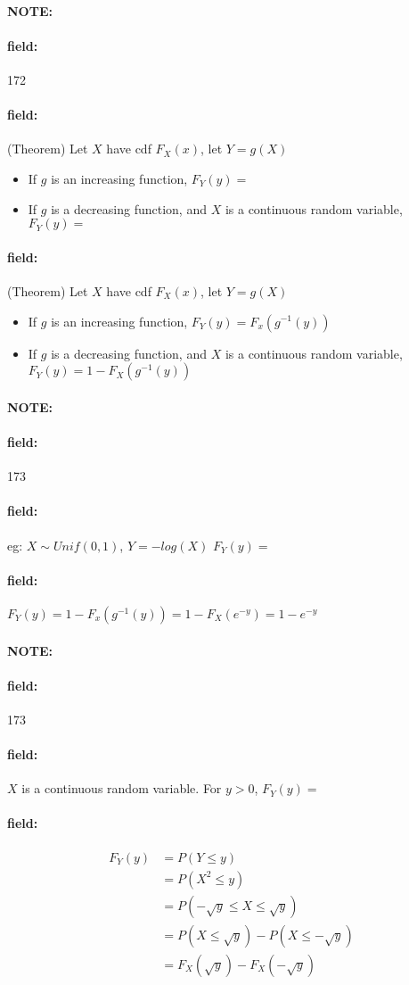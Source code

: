 \documentclass[12pt]{article}
\newenvironment{note}{\paragraph{NOTE:}}{}
\newenvironment{field}{\paragraph{field:}}{}
\begin{document}
\begin{note} \begin{field} \tiny 172 \end{field}
  \begin{field}
    (Theorem) Let $X$ have cdf $F_X(x)$, let $Y = g(X)$
    \begin{itemize}
      \item If $g$ is an increasing function, $F_Y(y) = $
      \item If $g$ is a decreasing function, and $X$ is a continuous random variable, $F_Y(y) = $
    \end{itemize}
  \end{field}
  \begin{field}
    (Theorem) Let $X$ have cdf $F_X(x)$, let $Y = g(X)$
    \begin{itemize}
      \item If $g$ is an increasing function, $F_Y(y) = F_x(g^{-1}(y))$
      \item If $g$ is a decreasing function, and $X$ is a continuous random variable, $F_Y(y) = 1 - F_X(g^{-1}(y))$
    \end{itemize}
  \end{field}
\end{note}

\begin{note} \begin{field} \tiny 173 \end{field}
  \begin{field}
    eg: $X \sim Unif(0,1)$, $Y = -log(X)$
    $F_Y(y) = $
  \end{field}
  \begin{field}
    $F_Y(y) = 1 - F_x(g^{-1}(y)) = 1 - F_X(e^{-y}) = 1 - e^{-y}$
  \end{field}
\end{note}


\begin{note} \begin{field} \tiny 173  \end{field}
  \begin{field}
    $X$ is a continuous random variable. For $y > 0$,
    $F_Y(y) = $
  \end{field}
  \begin{field}
    \begin{align*}
      F_Y(y) &= P(Y \leq y)\\
      &= P(X^2 \leq y)\\
      &= P(- \sqrt{y} \leq X \leq \sqrt{y})\\
      &= P(X \leq \sqrt{y}) - P(X \leq -\sqrt{y})\\
      &= F_X(\sqrt{y}) - F_X( - \sqrt{y})
    \end{align*}
  \end{field}
\end{note}
\end{document}
